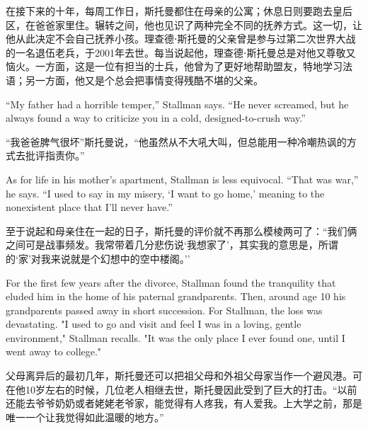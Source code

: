 \ifdefined\chs
在接下来的十年，每周工作日，斯托曼都住在母亲的公寓；休息日则要跑去皇后区，在爸爸家里住。辗转之间，他也见识了两种完全不同的抚养方式。这一切，让他从此决定不会自己抚养小孩。理查德⋅斯托曼的父亲曾是参与过第二次世界大战的一名退伍老兵，于2001年去世。每当说起他，理查德⋅斯托曼总是对他又尊敬又恼火。一方面，这是一位有担当的士兵，他曾为了更好地帮助盟友，特地学习法语；另一方面，他又是个总会把事情变得残酷不堪的父亲。
\fi

\ifdefined\eng
``My father had a horrible temper,'' Stallman says. ``He never screamed, but he always found a way to criticize you in a cold, designed-to-crush way.''
\fi

\ifdefined\chs
``我爸爸脾气很坏''斯托曼说，``他虽然从不大吼大叫，但总能用一种冷嘲热讽的方式去批评指责你。''
\fi

\ifdefined\eng
As for life in his mother's apartment, Stallman is less equivocal. ``That was war,'' he says. ``I used to say in my misery, `I want to go home,' meaning to the nonexistent place that I'll never have.''
\fi

\ifdefined\chs
至于说起和母亲住在一起的日子，斯托曼的评价就不再那么模棱两可了：``我们俩之间可是战事频发。我常带着几分悲伤说`我想家了'，其实我的意思是，所谓的`家'对我来说就是个幻想中的空中楼阁。''
\fi

\ifdefined\eng
For the first few years after the divorce, Stallman found the tranquility that eluded him in the home of his paternal grandparents. Then, around age 10 his grandparents passed away in short succession. For Stallman, the loss was devastating. "I used to go and visit and feel I was in a loving, gentle environment," Stallman recalls. "It was the only place I ever found one, until I went away to college."
\fi

\ifdefined\chs
父母离异后的最初几年，斯托曼还可以把祖父母和外祖父母家当作一个避风港。可在他10岁左右的时候，几位老人相继去世，斯托曼因此受到了巨大的打击。``以前还能去爷爷奶奶或者姥姥老爷家，能觉得有人疼我，有人爱我。上大学之前，那是唯一一个让我觉得如此温暖的地方。''
\fi


